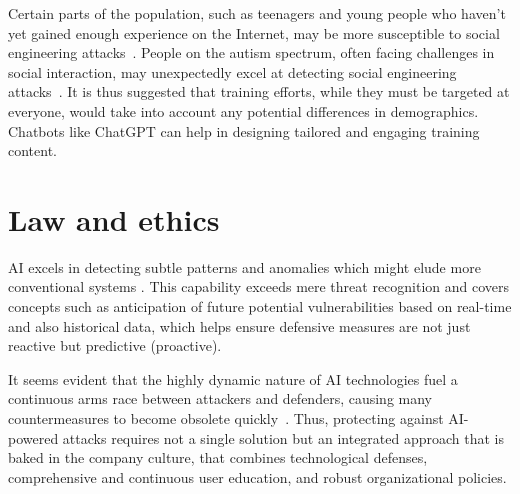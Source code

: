 %
%
Certain parts of the population, such as teenagers and young people who haven't yet gained enough experience on the Internet, may be more susceptible to social engineering attacks~\citep{nicholson_Investigating_Teenagers_Detect_Phishing_2020}. People on the autism spectrum, often facing challenges in social interaction, may unexpectedly excel at detecting social engineering attacks~\citep{neupane_Social_Disorders_Facilitate_SE_2018}. It is thus suggested that training efforts, while they must be targeted at everyone, would take into account any potential differences in demographics. Chatbots like ChatGPT can help in designing tailored and engaging training content.















\section{Law and ethics}
\begin{comment}    
    - Deepfake content detection
    - Spear phishing detection
\end{comment}


    AI excels in detecting subtle patterns and anomalies which might elude more conventional systems \citep{fakhouri_AI_Driven_Solutions_SE_Attacks_2024}. This capability exceeds mere threat recognition and covers concepts such as anticipation of future potential vulnerabilities based on real-time and also historical data, which helps ensure defensive measures are not just reactive but predictive (proactive).

It seems evident that the highly dynamic nature of AI technologies fuel a continuous arms race between attackers and defenders, causing many countermeasures to become obsolete quickly~\citep{fakhouri_AI_Driven_Solutions_SE_Attacks_2024}. Thus, protecting against AI-powered attacks requires not a single solution but an integrated approach that is baked in the company culture, that combines technological defenses, comprehensive and continuous user education, and robust organizational policies.

